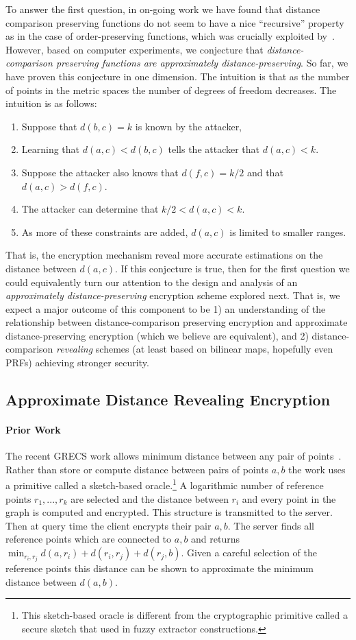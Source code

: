 To answer the first question, in on-going work we have found that distance comparison preserving functions do not seem to have a nice ``recursive'' property as in the case of order-preserving functions, which was crucially exploited by~\cite{EC:BCLO09}.  However, based on computer experiments, we conjecture that \emph{distance-comparison preserving functions are approximately distance-preserving}.    So far, we have proven this conjecture in one dimension.  The intuition is that as the number of points in the metric spaces the number of degrees of freedom decreases.  The intuition is as follows:
\begin{enumerate}\setlength\itemsep{0em}
\item Suppose that $d(b,c) = k$ is known by the attacker, 
\item Learning that $d(a,c) < d(b,c)$ tells the attacker that $d(a,c)<k$.  
\item Suppose the attacker also knows that $d(f, c) = k/2$ and that $d(a,c) > d(f,c)$.  
\item The attacker can determine that $k/2< d(a,c) <k$.  
\item As more of these constraints are added, $d(a,c)$ is limited to smaller ranges.
\end{enumerate}
That is, the encryption mechanism reveal more accurate estimations on  the distance between $d(a,c)$.
If this conjecture is true, then for the first question we could equivalently turn our attention to the design and analysis of  an \emph{approximately distance-preserving} encryption scheme explored next.  That is, we expect a major outcome of this component to be 1) an understanding of the relationship between distance-comparison preserving encryption and approximate distance-preserving encryption (which we believe are equivalent), and 2) distance-comparison \emph{revealing} schemes (at least based on bilinear maps, hopefully even PRFs) achieving stronger security.

\subsection{Approximate Distance Revealing Encryption}
\paragraph{Prior Work}
The recent GRECS work allows minimum distance between any pair of points~\cite{CCS:MKNK15}.  Rather than store or compute distance between pairs of points $a,b$ the work uses a primitive called a sketch-based oracle.\footnote{This sketch-based oracle is different from the cryptographic primitive called a secure sketch that used in fuzzy extractor constructions.}  A logarithmic number of reference points $r_1,..., r_k$ are selected and the distance between $r_i$ and every point in the graph is computed and encrypted.  This structure is transmitted to the server.  Then at query time the client encrypts their pair $a,b$.  The server finds all reference points which are connected to $a,b$ and returns $\min_{r_i, r_j} d(a,r_i) + d(r_i, r_j) + d(r_j, b)$.  Given a careful selection of the reference points this distance can be shown to approximate the minimum distance between $d(a,b)$.


